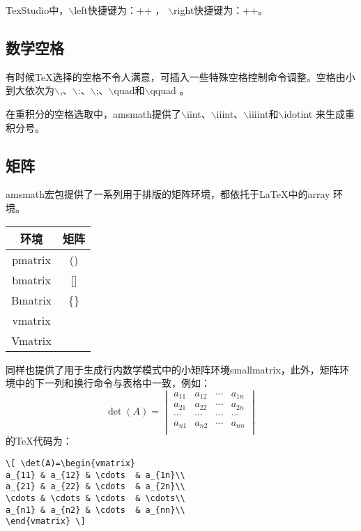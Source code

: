 TexStudio中，$\backslash$left快捷键为：++ ， $\backslash$right快捷键为：++。

\subsection{数学空格}
有时候\TeX{}选择的空格不令人满意，可插入一些特殊空格控制命令调整。空格由小到大依次为$\backslash$,、$\backslash$:、$\backslash$;、$\backslash$quad和$\backslash$qquad 。

在重积分的空格选取中，amsmath提供了$\backslash$iint、$\backslash$iiint、$\backslash$iiiint和$\backslash$idotint 来生成重积分号。

\subsection{矩阵}
amsmath宏包提供了一系列用于排版的矩阵环境，都依托于\LaTeX{}中的array 环境。
\begin{table}[htbp]
	\centering
	\vspace{0.2cm}
	\zhongwu
	\begin{tabular}{cc}
		\toprule
		环境  & 矩阵 \\
		\midrule
		pmatrix   &     ()   \\
		bmatrix   &     []   \\
		Bmatrix	  &   \{\}   \\
		vmatrix   &          \\
		Vmatrix   &          \\ 
		\bottomrule
	\end{tabular}
\end{table}

同样也提供了用于生成行内数学模式中的小矩阵环境smallmatrix，此外，矩阵环境中的下一列和换行命令与表格中一致，例如：
\[ \det(A)=\begin{vmatrix}
a_{11} & a_{12} & \cdots  & a_{1n}\\
a_{21} & a_{22} & \cdots  & a_{2n}\\
\cdots & \cdots & \cdots  & \cdots\\
a_{n1} & a_{n2} & \cdots  & a_{nn}\\
\end{vmatrix} \]的\TeX{}代码为：
\begin{lstlisting}
\[ \det(A)=\begin{vmatrix}
a_{11} & a_{12} & \cdots  & a_{1n}\\
a_{21} & a_{22} & \cdots  & a_{2n}\\
\cdots & \cdots & \cdots  & \cdots\\
a_{n1} & a_{n2} & \cdots  & a_{nn}\\
\end{vmatrix} \]
\end{lstlisting}

